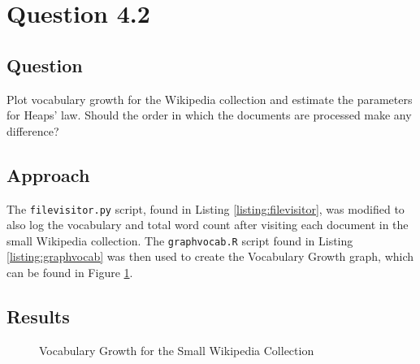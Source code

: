 \section{Question 4.2}

\subsection{Question}
Plot vocabulary growth for the Wikipedia collection and estimate the parameters for Heaps' law. Should the order in which the documents are processed make any difference?

\subsection{Approach}
The \texttt{filevisitor.py} script, found in Listing \ref{listing:filevisitor}, was modified to also log the vocabulary and total word count after visiting each document in the small Wikipedia collection.  The \texttt{graphvocab.R} script found in Listing \ref{listing:graphvocab} was then used to create the Vocabulary Growth graph, which can be found in Figure \ref{fig:vocab}.

\subsection{Results}

\begin{figure}[h!]
\centering
\label{fig:vocab}
\caption{Vocabulary Growth for the Small Wikipedia Collection}
\end{figure}